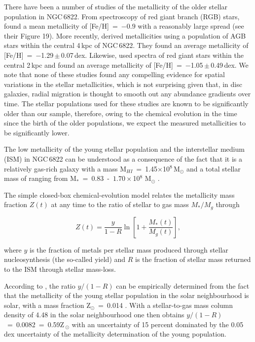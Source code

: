 There have been a number of studies of the metallicity of the older stellar population in NGC\,6822.
From spectroscopy of red giant branch (RGB) stars,
\cite{2001MNRAS.327..918T} found a mean metallicity of [Fe/H]~=~$-0.9$
with a reasonably large spread (see their Figure 19).
More recently,
\cite{2012A&A...540A.135S} derived metallicities using a population of AGB stars within the central 4\,kpc of NGC\,6822.
They found an average metallicity of [Fe/H]~=~$-$1.29\,$\pm$\,0.07\,dex.
Likewise,
\cite{2013ApJ...779..102K}
used spectra of red giant stars within the central 2\,kpc and found an average metallicity of
[Fe/H]~=~$-$1.05\,$\pm$\,0.49\,dex.
We note that none of these studies found any compelling evidence for spatial variations in the stellar metallicities,
which is not surprising given that, in disc galaxies, radial migration is thought to smooth out any abundance gradients over time.
The stellar populations used for these studies are known to be significantly older than our sample,
therefore, owing to the chemical evolution in the time since the birth of the older populations,
we expect the measured metallicities to be significantly lower.

The low metallicity of the young stellar population and the interstellar medium (ISM) in NGC\,6822 can be understood as a consequence of the fact that it is a relatively gas-rich galaxy with a mass
M$_{HI}$~=~1.45$\times$10$^{8}$\,M$_{\odot}$
\citep{2004AJ....128...16K} and a total stellar mass of ranging from
M$_{*}$~=~$0.83$~-~$1.70\times$10$^{8}$ M$_{\odot}$
\citep{2008MNRAS.390.1453W,2013ApJ...779..102K,2014ApJ...789..147W}.

The simple closed-box chemical-evolution model relates the metallicity mass fraction $Z(t)$ at any time to the ratio of stellar to gas mass $M_{*}/M_{g}$ through

\begin{equation}\label{closed-box}
Z(t) = \frac{y}{1-R} \ln \left[ 1 + \frac{M_{*}(t)}{M_{g}(t)}  \right],
\end{equation}

\noindent where $y$ is the fraction of metals per stellar mass produced through stellar nucleosynthesis
(the so-called yield) and $R$ is the fraction of stellar mass returned to the ISM through stellar mass-loss.

According to
\citet{2015MNRAS.450..342K}, the ratio $y/(1-R)$ can be empirically determined from the fact that the metallicity of the young stellar population in the solar neighbourhood is solar, with a mass fraction Z$_{\odot}$~=~0.014
\citep{2012A&A...539A.143N}.
With a stellar-to-gas mass column density of 4.48 in the solar neighbourhood
\citep{2003ApJ...587..278W,2013ApJ...779..115B}
one then obtains $y/(1-R)$~=~0.0082~=~0.59Z\,$_{\odot}$ with an uncertainty of 15 percent dominated by the 0.05\,dex uncertainty of the metallicity determination of the young population.

